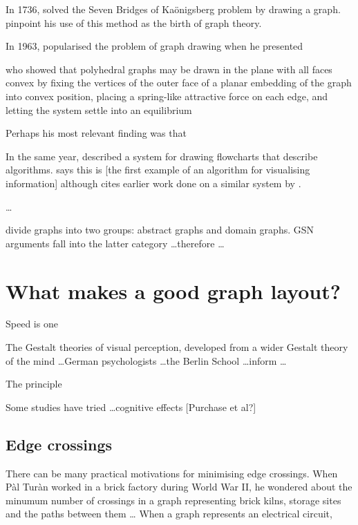 \documentclass[authoryearcitations]{UoYCSproject}
\begin{document}
In 1736, \citet{euler} solved the Seven Bridges of Ka\"{o}nigsberg problem by drawing a graph.
\citet{ismail2009some}
pinpoint his use of this method as the birth of graph theory.

In 1963, \citet{tutte} popularised the problem of graph drawing when he presented 

who showed that polyhedral graphs may be drawn in the plane with all faces convex by fixing the vertices of the outer face of a planar embedding of the graph into convex position, placing a spring-like attractive force on each edge, and letting the system settle into an equilibrium

Perhaps his most relevant finding was that 

In the same year, \citet{Knuth63} described a system for drawing flowcharts that describe algorithms. \citet{battista}  says this is [the first example of an algorithm for visualising information] although \citeauthor{Knuth63} cites earlier work done on a similar system by \citet{haibt1959}.




\ldots

\citet{huang2007effects} divide graphs into two groups: abstract graphs and domain graphs.
GSN arguments fall into the latter category \ldots  therefore \ldots
{}


\section{What makes a good graph layout?}

Speed is one 

The Gestalt theories of visual perception, developed from a wider Gestalt theory of the mind  \ldots German psychologists \ldots the Berlin School \ldots inform  \ldots 

The principle 

Some studies have tried \ldots cognitive effects [Purchase et al?]

\subsection{Edge crossings}

There can be many practical motivations for minimising edge crossings.
When P\`{a}l Tur\`{a}n worked in a brick factory during World War II, he wondered about the minumum number of crossings in a graph representing brick kilns, storage sites and the paths between them \ldots
When a graph represents an electrical circuit, 
\end{document}
